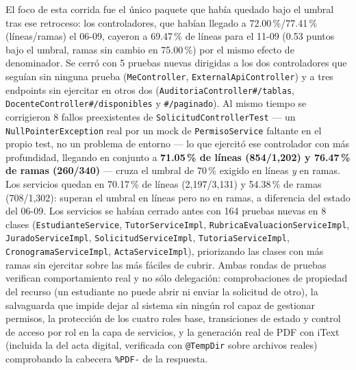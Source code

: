 El foco de esta corrida fue el único paquete que había quedado bajo el umbral tras ese retroceso: los
controladores, que habían llegado a 72.00\,\%/77.41\,\% (líneas/ramas) el 06-09, cayeron a 69.47\,\% de
líneas para el 11-09 (0.53 puntos bajo el umbral, ramas sin cambio en 75.00\,\%) por el mismo efecto de
denominador. Se cerró con 5 pruebas nuevas dirigidas a los dos controladores que seguían sin ninguna
prueba (\texttt{MeController}, \texttt{ExternalApiController}) y a tres endpoints sin ejercitar en otros
dos (\texttt{AuditoriaController\#/tablas}, \texttt{DocenteController\#/disponibles} y \texttt{\#/paginado}).
Al mismo tiempo se corrigieron 8 fallos preexistentes de \texttt{SolicitudControllerTest} --- un
\texttt{NullPointerException} real por un mock de \texttt{PermisoService} faltante en el propio test, no
un problema de entorno --- lo que ejercitó ese controlador con más profundidad, llegando en conjunto a
\textbf{71.05\,\% de líneas (854/1,202) y 76.47\,\% de ramas (260/340)} --- cruza el umbral de 70\,\%
exigido en líneas \emph{y} en ramas. Los servicios quedan en 70.17\,\% de líneas (2,197/3,131) y
54.38\,\% de ramas (708/1,302): superan el umbral en líneas pero no en ramas, a diferencia del estado del
06-09. Los servicios se habían cerrado antes con 164 pruebas nuevas en
8 clases (\texttt{EstudianteService}, \texttt{TutorServiceImpl}, \texttt{RubricaEvaluacionServiceImpl},
\texttt{JuradoServiceImpl}, \texttt{SolicitudServiceImpl}, \texttt{TutoriaServiceImpl},
\texttt{CronogramaServiceImpl}, \texttt{ActaServiceImpl}), priorizando las clases con más ramas sin
ejercitar sobre las más fáciles de cubrir. Ambas rondas de pruebas verifican comportamiento real y no
sólo delegación: comprobaciones de propiedad del recurso (un estudiante no puede abrir ni enviar la
solicitud de otro), la salvaguarda que impide dejar al sistema sin ningún rol capaz de gestionar permisos,
la protección de los cuatro roles base, transiciones de estado y control de acceso por rol en la capa de
servicios, y la generación real de PDF con iText (incluida la del acta digital, verificada con
\texttt{@TempDir} sobre archivos reales) comprobando la cabecera \texttt{\%PDF-} de la respuesta.

